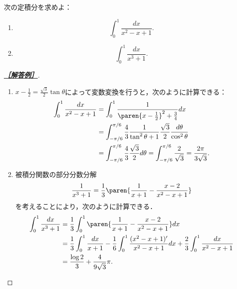 \documentclass[uplatex,dvipdfmx]{jsarticle}
\begin{document}
\begin{tcolorbox}[colframe=ForestGreen, colback=ForestGreen!10!white,breakable,colbacktitle=ForestGreen!40!white,coltitle=black,fonttitle=\bfseries\sffamily,
    title=第２問]
    次の定積分を求めよ：
    \begin{enumerate}
        \item \[\int^1_0\frac{dx}{x^2-x+1}.\]
        \item \[\int^1_0\frac{dx}{x^3+1}.\]
    \end{enumerate}
\end{tcolorbox}
\begin{proof}[\textbf{\underline{［解答例］}}]\mbox{}
    \begin{enumerate}
        \item $x-\frac{1}{2}=\frac{\sqrt{3}}{2}\tan\theta$によって変数変換を行うと，次のように計算できる：
        \begin{align*}
            \int^1_0\frac{dx}{x^2-x+1}&=\int^1_0\frac{1}{\paren{x-\frac{1}{2}}^2+\frac{3}{4}}dx\\
            &=\int^{\pi/6}_{-\pi/6}\frac{4}{3}\frac{1}{\tan^2\theta+1}\frac{\sqrt{3}}{2}\frac{d\theta}{\cos^2\theta}\\
            &=\int^{\pi/6}_{-\pi/6}\frac{4}{3}\frac{\sqrt{3}}{2}d\theta
            =\int^{\pi/6}_{-\pi/6}\frac{2}{\sqrt{3}}=\frac{2\pi}{3\sqrt{3}}.
        \end{align*}
        \item 被積分関数の部分分数分解
        \[\frac{1}{x^3+1}=\frac{1}{3}\paren{\frac{1}{x+1}-\frac{x-2}{x^2-x+1}}\]
        を考えることにより，次のように計算できる．
        \begin{align*}
            \int^1_0\frac{dx}{x^3+1}&=\frac{1}{3}\int^1_0\paren{\frac{1}{x+1}-\frac{x-2}{x^2-x+1}}dx\\
            &=\frac{1}{3}\int^1_0\frac{dx}{x+1}-\frac{1}{6}\int^1_0\frac{(x^2-x+1)'}{x^2-x+1}dx+\frac{2}{3}\int^1_0\frac{dx}{x^2-x+1}\\
            &=\frac{\log 2}{3}+\frac{4}{9\sqrt{3}}\pi.
        \end{align*}
    \end{enumerate}
\end{proof}
\end{document}
